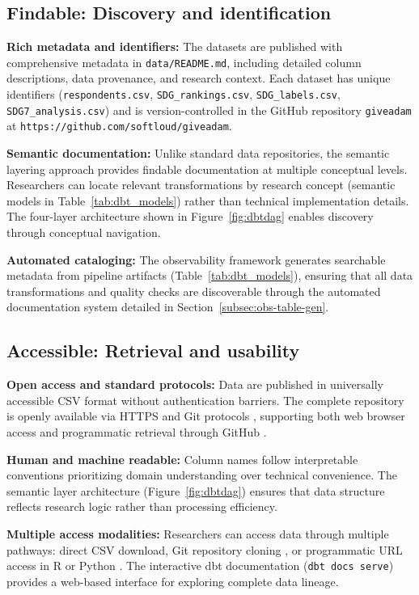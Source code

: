 \documentclass{article}
\begin{document}
\subsection{Findable: Discovery and identification}

\textbf{Rich metadata and identifiers:} The datasets are published with comprehensive metadata in \texttt{data/README.md}, including detailed column descriptions, data provenance, and research context. Each dataset has unique identifiers (\texttt{respondents.csv}, \texttt{SDG\_rankings.csv}, \texttt{SDG\_labels.csv}, \texttt{SDG7\_analysis.csv}) and is version-controlled in the GitHub repository \texttt{giveadam} at \texttt{https://github.com/softloud/giveadam}.

\textbf{Semantic documentation:} Unlike standard data repositories, the semantic layering approach provides findable documentation at multiple conceptual levels. Researchers can locate relevant transformations by research concept (semantic models in Table~\ref{tab:dbt_models}) rather than technical implementation details. The four-layer architecture shown in Figure~\ref{fig:dbtdag} enables discovery through conceptual navigation.

\textbf{Automated cataloging:} The observability framework generates searchable metadata from pipeline artifacts (Table~\ref{tab:dbt_models}), ensuring that all data transformations and quality checks are discoverable through the automated documentation system detailed in Section~\ref{subsec:obs-table-gen}.

\subsection{Accessible: Retrieval and usability}

\textbf{Open access and standard protocols:} Data are published in universally accessible CSV format \cite{csv_rfc} without authentication barriers. The complete repository is openly available via HTTPS and Git protocols \cite{git}, supporting both web browser access and programmatic retrieval through GitHub \cite{github}.

\textbf{Human and machine readable:} Column names follow interpretable conventions prioritizing domain understanding over technical convenience. The semantic layer architecture (Figure~\ref{fig:dbtdag}) ensures that data structure reflects research logic rather than processing efficiency.

\textbf{Multiple access modalities:} Researchers can access data through multiple pathways: direct CSV download, Git repository cloning \cite{git}, or programmatic URL access in R \cite{r_core} or Python \cite{python}. The interactive dbt documentation (\texttt{dbt docs serve}) \cite{dbt_core} provides a web-based interface for exploring complete data lineage.
\end{document}
